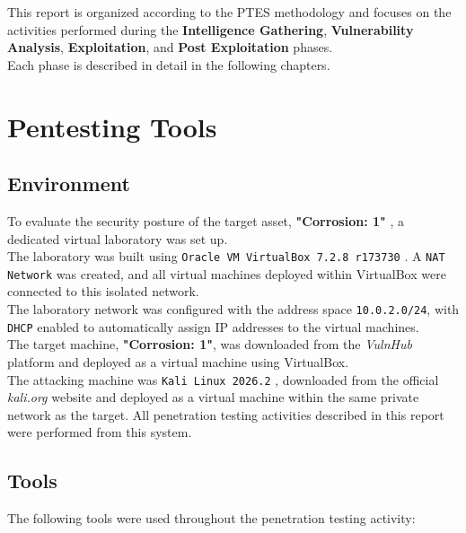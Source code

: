 This report is organized according to the PTES methodology and focuses on the activities performed during the \textbf{Intelligence Gathering}, \textbf{Vulnerability Analysis}, \textbf{Exploitation}, and \textbf{Post Exploitation} phases. 
\\

Each phase is described in detail in the following chapters.

\section{Pentesting Tools}

\subsection{Environment}

To evaluate the security posture of the target asset, \textbf{"Corrosion: 1"} \cite{vulnhubCorrosion}, a dedicated virtual laboratory was set up.
\\

The laboratory was built using \texttt{Oracle VM VirtualBox 7.2.8 r173730} \cite{virtualbox}. A \texttt{NAT Network} was created, and all virtual machines deployed within VirtualBox were connected to this isolated network.
\\

The laboratory network was configured with the address space \texttt{10.0.2.0/24}, with \texttt{DHCP} enabled to automatically assign IP addresses to the virtual machines.
\\

The target machine, \textbf{"Corrosion: 1"}, was downloaded from the \textit{VulnHub} platform and deployed as a virtual machine using VirtualBox.
\\

The attacking machine was \texttt{Kali Linux 2026.2} \cite{kali}, downloaded from the official \textit{kali.org} website and deployed as a virtual machine within the same private network as the target. All penetration testing activities described in this report were performed from this system.

\subsection{Tools}

The following tools were used throughout the penetration testing activity:

